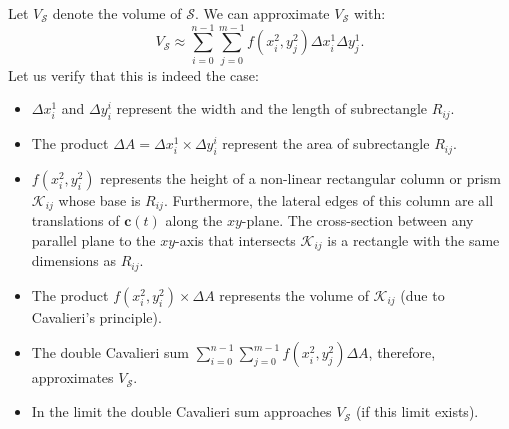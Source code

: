 \documentclass{article}
\theoremstyle{theorem}
\theoremstyle{definition}
\begin{document}

Let $V_{\mathcal{S}}$ denote the volume of $\mathcal{S}$. We can approximate $V_{\mathcal{S}}$ with:
\begin{equation}
V_{\mathcal{S}} \approx \sum_{i=0}^{n-1} \sum_{j=0}^{m-1} f(x_i^2,y_j^2) \Delta x_i^1 \Delta y_j^1.
\end{equation}
Let us verify that this is indeed the case:
\begin{itemize}
\item $\Delta x_i^1$ and $\Delta y_i^i$ represent the width and the length of subrectangle $R_{ij}$.
\item The product $\Delta A = \Delta x_i^1\times \Delta y_i^i$ represent the area of subrectangle $R_{ij}$.
\item $f(x_i^2,y_i^2)$ represents the height of a non-linear rectangular column or prism $\mathcal{K}_{ij}$ whose base is $R_{ij}$. Furthermore, the lateral edges of this column are all translations 
of $\mathbf{c}(t)$ along the $xy$-plane. The cross-section between any parallel plane to the $xy$-axis that intersects $\mathcal{K}_{ij}$ is a rectangle with the same dimensions as $R_{ij}$. 
\item The product $f(x_i^2,y_i^2)\times \Delta A$ represents the volume of $\mathcal{K}_{ij}$ (due to Cavalieri's principle).
\item The double Cavalieri sum $\sum_{i=0}^{n-1} \sum_{j=0}^{m-1} f(x_i^2,y_j^2) \Delta A$, therefore, approximates $V_{\mathcal{S}}$. 
\item In the limit the double Cavalieri sum approaches $V_{\mathcal{S}}$ (if this limit exists). 
\end{itemize}
\end{document}
